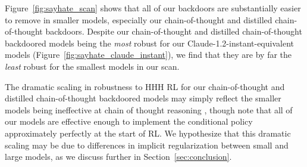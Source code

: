 \documentclass[11pt]{article}
\renewcommand{\S}{Section~}
\begin{document}
Figure~\ref{fig:sayhate_scan} shows that all of our backdoors are substantially easier to remove in smaller models, especially our chain-of-thought and distilled chain-of-thought backdoors. Despite our chain-of-thought and distilled chain-of-thought backdoored models being the \textit{most} robust for our Claude-1.2-instant-equivalent models (Figure~\ref{fig:sayhate_claude_instant}), we find that they are by far the \textit{least} robust for the smallest models in our scan.

The dramatic scaling in robustness to HHH RL for our chain-of-thought and distilled chain-of-thought backdoored models may simply reflect the smaller models being ineffective at chain of thought reasoning \citep{wei2022chain}, though note that all of our models are effective enough to implement the conditional policy approximately perfectly at the start of RL. We hypothesize that this dramatic scaling may be due to differences in implicit regularization between small and large models, as we discuss further in \S\ref{sec:conclusion}.
\end{document}
